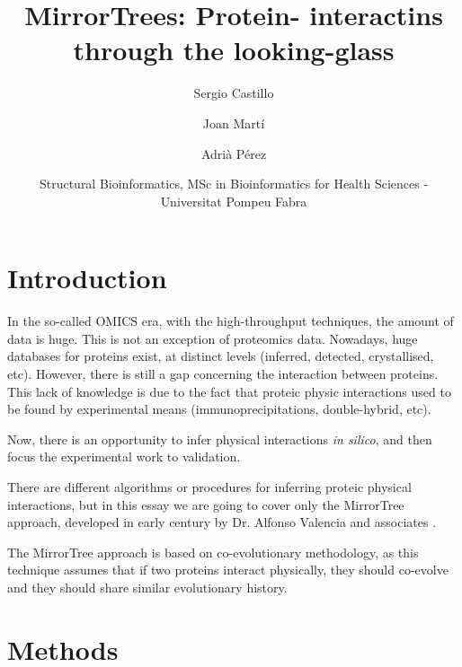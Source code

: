 \documentclass[11pt]{article}
\title{MirrorTrees: Protein-	interactins through the looking-glass}
\author{
	Sergio Castillo
	\and
	Joan Martí
	\and
	Adrià Pérez
}
\date{Structural Bioinformatics, MSc in Bioinformatics for Health Sciences - Universitat Pompeu Fabra}
\begin{document}
\maketitle

\section{Introduction}
In the so-called OMICS era, with the high-throughput techniques, the amount of data is huge. This is not an exception of proteomics data. Nowadays, huge databases for proteins exist, at distinct levels (inferred, detected, crystallised, etc). However, there is still a gap concerning the interaction between proteins. This lack of knowledge is due to the fact that proteic physic interactions used to be found by experimental means (immunoprecipitations, double-hybrid, etc).


Now, there is an opportunity to infer physical interactions \textit{in silico}, and then focus the experimental work to validation.

There are different algorithms or procedures for inferring proteic physical interactions, but in this essay we are going to cover only the MirrorTree approach, developed in early century by Dr. Alfonso Valencia and associates \cite{Pazos2001}.


The MirrorTree approach is based on co-evolutionary methodology, as this technique assumes that if two proteins interact physically, they should co-evolve and they should share similar evolutionary history.



\section{Methods}
\end{document}

